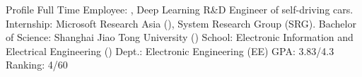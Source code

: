 
\begin{rubric}{Profile}
		Full Time Employee: , Deep Learning R\&D Engineer of self-driving cars.
		Internship: Microsoft Research Asia (), System Research Group (SRG).
		Bachelor of Science: Shanghai Jiao Tong University ()
	\in{}
		School: Electronic Information and Electrical Engineering () \qquad \qquad \qquad \qquad 
	\in{}
		Dept.: Electronic Engineering (EE) \quad GPA: 3.83/4.3 \quad Ranking: 4/60 
\end{rubric}
